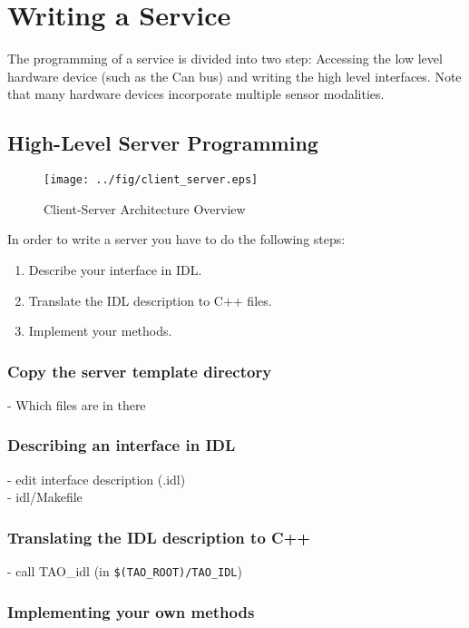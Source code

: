 \chapter{Writing a \miro Service}

The programming of a \miro service is divided into two step:
Accessing the low level hardware device (such as the Can bus) and
writing the high level interfaces. Note that many hardware devices
incorporate multiple sensor modalities.


\section{High-Level Server Programming}

\begin{figure}[!ht]
  \texttt{[image: ../fig/client\_server.eps]}
  \caption{Client-Server Architecture Overview}
  \label{FIG_CLIENT_SERVER_ARCHITECTURE}
\end{figure}

In order to write a server you have to do the following steps:
\begin{enumerate}
  \item Describe your interface in IDL.
  \item Translate the IDL description to C++ files.
  \item Implement your methods.
\end{enumerate}


\subsection{Copy the \miro server template directory}

- Which files are in there


\subsection{Describing an interface in IDL}

- edit interface description (.idl) \\
- idl/Makefile 

\subsection{Translating the IDL description to C++}

- call TAO\_idl (in {\tt \$(TAO\_ROOT)/TAO\_IDL})

\subsection{Implementing your own methods}

